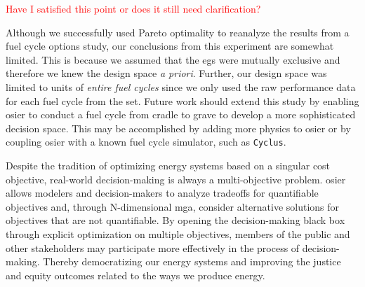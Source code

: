 \textcolor{red}{Have I satisfied this point or does it still need clarification?}

Although we successfully used Pareto optimality to reanalyze the results from 
a fuel cycle options study, our conclusions from this experiment are somewhat 
limited. This is because we assumed that the \glspl{eg} were mutually exclusive
and therefore we knew the design space \textit{a priori}. Further, our design space
was limited to units of \textit{entire fuel cycles} since we only used the raw 
performance data for each fuel cycle from the \gls{set}. Future work should 
extend this study by enabling \gls{osier} to conduct a fuel cycle from cradle to 
grave to develop a more sophisticated decision space. This may be accomplished
by adding more physics to \gls{osier} or by coupling \gls{osier} with a known 
fuel cycle simulator, such as \texttt{Cyclus}.

Despite the tradition of optimizing energy systems based on a singular cost
objective, real-world decision-making is always a multi-objective problem.
\gls{osier} allows modelers and decision-makers to analyze tradeoffs for 
quantifiable objectives and, through N-dimensional \gls{mga}, consider
alternative solutions for objectives that are not quantifiable. By opening
the decision-making black box through explicit optimization on multiple objectives,
members of the public and other stakeholders may participate more effectively 
in the process of decision-making. Thereby democratizing our energy systems and improving
the justice and equity outcomes related to the ways we produce energy.